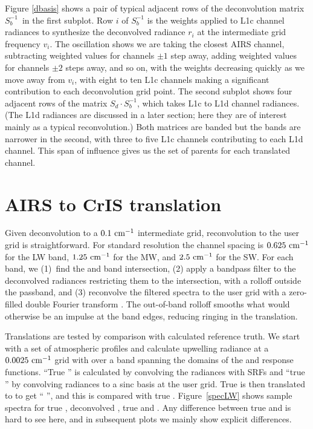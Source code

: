 \documentclass[journal]{IEEEtran}
\begin{document}
Figure \ref{dbasis} shows a pair of typical adjacent rows of the
deconvolution matrix $S_b^{-1}$\, in the first subplot.  Row $i$ of
$S_b^{-1}$ is the weights applied to L1c channel radiances to
synthesize the deconvolved radiance $r_i$ at the intermediate grid
frequency $v_i$.  The oscillation shows we are taking the closest
AIRS channel, subtracting weighted values for channels $\pm 1$ step
away, adding weighted values for channels $\pm 2$ steps away, and so
on, with the weights decreasing quickly as we move away from $v_i$,
with eight to ten L1c channels making a significant contribution to
each deconvolution grid point.  The second subplot shows four
adjacent rows of the matrix $S_d \cdot S_b^{-1}$, which takes L1c to
L1d channel radiances.  (The L1d radiances are discussed in a later
section; here they are of interest mainly as a typical
reconvolution.)  Both matrices are banded but the bands are narrower
in the second, with three to five L1c channels contributing to each
L1d channel.  This span of influence gives us the set of parents for
each translated channel.

\section{AIRS to CrIS translation}
\label{airs2cris}

Given {\airs} deconvolution to a $0.1~\mbox{cm$^{-1}$}$ intermediate grid,
reconvolution to the {\cris} user grid is straightforward.  For
{\cris} standard resolution the channel spacing is $0.625~\mbox{cm$^{-1}$}$ 
for the LW band, $1.25~\mbox{cm$^{-1}$}$ for the MW, and $2.5~\mbox{cm$^{-1}$}$ for the SW.
For each {\cris} band, we (1)~find the {\airs} and {\cris} band
intersection, (2) apply a bandpass filter to the deconvolved {\airs}
radiances restricting them to the intersection, with a rolloff
outside the passband, and (3) reconvolve the filtered spectra to 
the {\cris} user grid with a zero-filled double Fourier transform
\cite{git:finterp}.  The out-of-band rolloff smooths what would
otherwise be an impulse at the band edges, reducing ringing in the
translation.  

Translations are tested by comparison with calculated reference
truth.  We start with a set of atmospheric profiles and calculate
upwelling radiance at a $0.0025~\mbox{cm$^{-1}$}$ grid with {\kcarta}
\cite{kcarta1} over a band spanning the domains of the {\airs} and
{\cris} response functions.  ``True {\airs}'' is calculated by
convolving the {\kcarta} radiances with {\airs} SRFs and ``true
{\cris}'' by convolving {\kcarta} radiances to a sinc basis at the
{\cris} user grid.  True {\airs} is then translated to {\cris} to
get ``{\airs} {\cris}'', and this is compared with true {\cris}.
Figure~\ref{specLW} shows sample spectra for true {\airs},
deconvolved {\airs}, true {\cris} and {\airs} {\cris}.  Any
difference between true {\cris} and {\airs} {\cris} is hard to see
here, and in subsequent plots we mainly show explicit differences.
\end{document}
